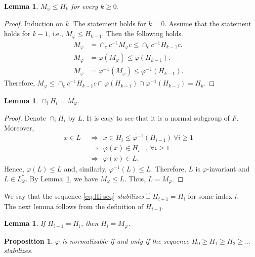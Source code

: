 \documentclass[12pt,oneside]{amsart}
\newtheorem{lemma}[theorem]{Lemma}
\newtheorem{proposition}[theorem]{Proposition}
\theoremstyle{definition}
\theoremstyle{case}
\begin{document}
\begin{lemma}\label{le:M-Hi}
$M_\varphi\le H_k$ for every $k\ge 0$.
\end{lemma}

\begin{proof}
Induction on $k$. The statement holds for $k=0$.
Assume that the statement holds for $k-1$, i.e., $M_\varphi\le H_{k-1}$.
Then the following holds.
\begin{align*}
M_\varphi &= \cap_c c^{-1} M_\varphi c\le \cap_c c^{-1} H_{k-1} c. \\
M_\varphi &=\varphi(M_\varphi)\le \varphi(H_{k-1}).\\
M_\varphi &=\varphi^{-1}(M_\varphi)\le \varphi^{-1}(H_{k-1}).
\end{align*}
Therefore,
$M_\varphi\le 
\cap_c c^{-1} H_{k-1} c \cap \varphi(H_{k-1}) \cap \varphi^{-1}(H_{k-1}) 
= H_k$.
\end{proof}

\begin{lemma}
$\cap_i H_i = M_\varphi$.
\end{lemma}

\begin{proof}
Denote $\cap_i H_i$ by $L$. It is easy to see that it is 
a normal subgroup of $F$. Moreover,
\begin{align*}
x\in L
&\ \ \Rightarrow\ \ x\in H_i\le \varphi^{-1}(H_{i-1})\ \forall i\ge 1\\
&\ \ \Rightarrow\ \ \varphi(x)\in H_{i-1} \ \forall i\ge 1\\
&\ \ \Rightarrow\ \ \varphi(x)\in L.
\end{align*}
Hence, $\varphi(L) \le L$ and, similarly, $\varphi^{-1}(L) \le L$.
Therefore, $L$ is $\varphi$-invariant and $L \in L_\varphi^\ast$.
By Lemma~\ref{le:M-Hi}, we have $M_\varphi \le L$.
Thus, $L = M_\varphi$.
\end{proof}

We say that the sequence \eqref{eq:Hi-seq} \emph{stabilizes} 
if $H_{i+1}=H_i$ for some index $i$.
The next lemma follows from the definition of $H_{i+1}$.

\begin{lemma}\label{le:Hi-stabilizes}
If $H_{i+1}=H_i$, then $H_i=M_\varphi$.
\end{lemma}

\begin{proposition}
$\varphi$ is normalizable if and only if 
the sequence $H_0\ge H_1\ge H_2\ge \dots$ 
stabilizes.
\end{proposition}
\end{document}
